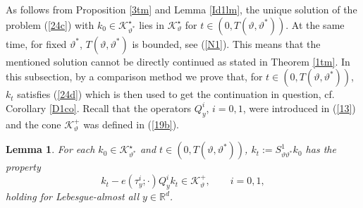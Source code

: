 \documentclass[reqno,11pt]{amsart}
\newtheorem{lemma}[theorem]{Lemma}
\theoremstyle{definition}
\theoremstyle{remark}
\numberwithin{equation}{section}
\begin{document}
As follows from Proposition \ref{3tm} and Lemma \ref{Id1lm}, the
unique solution of the problem (\ref{24c}) with $k_{0}\in
\mathcal{K}^\star_{\vartheta^*}$ lies in
$\mathcal{K}_\vartheta^\star$ for $t \in (0, T (\vartheta,
\vartheta^*))$. At the same time, for fixed $\vartheta^*$,  $T
(\vartheta, \vartheta^* )$ is bounded, see (\ref{N1}). This means
that the mentioned solution cannot be directly continued as stated
in Theorem \ref{1tm}. In this subsection,  by a comparison method we
prove that, for $t \in (0, T (\vartheta, \vartheta^*))$, $k_t$
satisfies (\ref{24d}) which is then used to get the continuation in
question, cf. Corollary \ref{D1co}. Recall that the operators
$Q_y^i$, $i=0,1$, were introduced in (\ref{13}) and the cone
$\mathcal{K}^+_\vartheta$ was defined in (\ref{19b}).
\begin{lemma}
  \label{J1lm}
For each $k_0\in \mathcal{K}_{\vartheta^*}^\star$ and $t \in (0, T
(\vartheta, \vartheta^*))$, $k_t := S^1_{\vartheta \vartheta^*}k_0$
has the property
\begin{equation}
  \label{75}
k_t - e(\tau^i_y;\cdot) Q^i_y k_t \in \mathcal{K}_\vartheta^+,
\qquad i=0,1,
\end{equation}
holding for Lebesgue-almost all $y\in \mathds{R}^d$.
\end{lemma}
\end{document}

